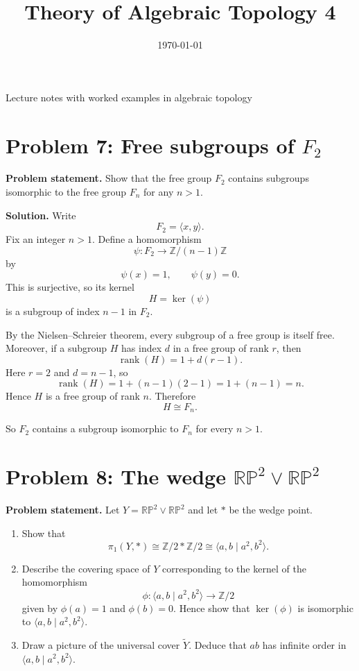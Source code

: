 \documentclass[12pt,a4paper]{article}
\title{\vspace{-1.5em}\bfseries Theory of Algebraic Topology 4}
\author{}
\date{\today}
\DeclareMathOperator{\rank}{rank}
\theoremstyle{notespace}
\begin{document}
	\maketitle
	\thispagestyle{plain}
		\begin{center}
		\begin{minipage}{0.92\textwidth}
			Lecture notes with worked examples in algebraic topology
		\end{minipage}
	\end{center}
		\tableofcontents
	\clearpage
	
\section{Problem 7: Free subgroups of \(F_2\)}

\textbf{Problem statement.}
Show that the free group \(F_2\) contains subgroups isomorphic to the free group \(F_n\) for any \(n>1\).

\medskip

\textbf{Solution.}
Write
\[
F_2=\langle x,y\rangle.
\]
Fix an integer \(n>1\). Define a homomorphism
\[
\psi:F_2\longrightarrow \mathbb Z/(n-1)\mathbb Z
\]
by
\[
\psi(x)=1,\qquad \psi(y)=0.
\]
This is surjective, so its kernel
\[
H=\ker(\psi)
\]
is a subgroup of index \(n-1\) in \(F_2\).

By the Nielsen--Schreier theorem, every subgroup of a free group is itself free. Moreover, if a subgroup \(H\) has index \(d\) in a free group of rank \(r\), then
\[
\rank(H)=1+d(r-1).
\]
Here \(r=2\) and \(d=n-1\), so
\[
\rank(H)=1+(n-1)(2-1)=1+(n-1)=n.
\]
Hence \(H\) is a free group of rank \(n\). Therefore
\[
H\cong F_n.
\]

So \(F_2\) contains a subgroup isomorphic to \(F_n\) for every \(n>1\).

\bigskip

\section{Problem 8: The wedge \(\mathbb{RP}^2\vee \mathbb{RP}^2\)}

\textbf{Problem statement.}
Let \(Y=\mathbb{RP}^2\vee \mathbb{RP}^2\) and let \(*\) be the wedge point.

\begin{enumerate}
	\item[(i)] Show that
	\[
	\pi_1(Y,*)\cong \mathbb Z/2 * \mathbb Z/2 \cong \langle a,b \mid a^2,b^2\rangle.
	\]
	
	\item[(ii)] Describe the covering space of \(Y\) corresponding to the kernel of the homomorphism
	\[
	\phi:\langle a,b \mid a^2,b^2\rangle \to \mathbb Z/2
	\]
	given by \(\phi(a)=1\) and \(\phi(b)=0\). Hence show that \(\ker(\phi)\) is isomorphic to \(\langle a,b \mid a^2,b^2\rangle\).
	
	\item[(iii)] Draw a picture of the universal cover \(\widetilde{Y}\). Deduce that \(ab\) has infinite order in \(\langle a,b \mid a^2,b^2\rangle\).
\end{enumerate}
\end{document}
